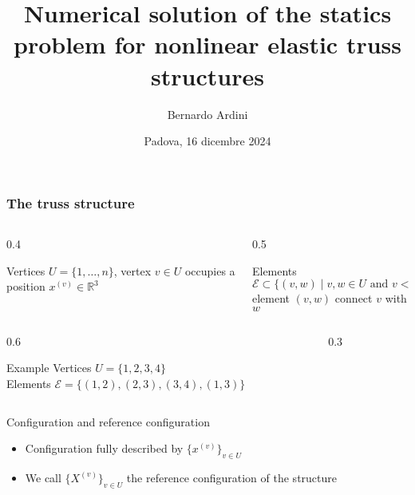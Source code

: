 \documentclass[10pt]{beamer}
\title[]{Numerical solution of the statics problem for nonlinear elastic truss structures}
\author[]{Bernardo Ardini}
\date{Padova, 16 dicembre 2024}
\theoremstyle{definition}
\begin{document}
\begin{frame}
\maketitle
\end{frame}

\begin{frame}
\frametitle{The truss structure}

\begin{columns}
\begin{column}{0.4\framewidth}
\begin{block}{Vertices}
$U=\{1,\dots,n\}$, vertex $v\in U$ occupies a position $x^{(v)}\in\mathbb{R}^3$
\end{block}
\end{column}
\begin{column}{0.5\framewidth}
\begin{block}{Elements}
$\mathcal{E}\subset\{(v,w)\;|\;\text{$v,w\in U$ and $v<w$}\}$ \\
element $(v,w)$ connect $v$ with $w$
\end{block}
\end{column}
\end{columns}

\begin{columns}
\begin{column}{0.6\framewidth}
\begin{block}{Example}
Vertices $U=\{1,2,3,4\}$ \\
Elements $\mathcal{E}=\{(1,2),(2,3),(3,4),(1,3)\}$
\end{block}
\end{column}
\begin{column}{0.3\framewidth}
\begin{center}
\end{center}
\end{column}
\end{columns}

\begin{block}{Configuration and reference configuration}
\begin{itemize}
\item Configuration fully described by $\{x^{(v)}\}_{v\in U}$
\item We call $\{X^{(v)}\}_{v\in U}$ the reference configuration of the structure
\end{itemize}
\end{block}

\end{frame}
\end{document}
